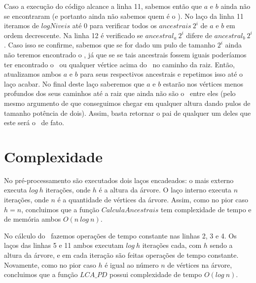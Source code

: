 Caso a execução do código alcance a linha 11, sabemos então que $a$ e $b$ ainda não se encontraram (e portanto ainda não sabemos quem é o \LCA). No laço da linha 11 iteramos de $logNiveis$ até 0 para verificar todos os $ancestrais\ 2^i$ de $a$ e $b$ em ordem decrescente. Na linha 12 é verificado se $ancestral_a\ 2^i$ difere de $ancestral_b\ 2^i$. Caso isso se confirme, sabemos que se for dado um pulo de tamanho $2^i$ ainda não teremos encontrado o \LCA, já que se se tais ancestrais fossem iguais poderíamos ter encontrado o \LCA\ ou qualquer vértice acima do \LCA\ no caminho da raiz. Então, atualizamos ambos $a$ e $b$ para seus respectivos ancestrais e repetimos isso até o laço acabar. No final deste laço saberemos que $a$ e $b$ estarão nos vértices menos profundos dos seus caminhos até a raiz que ainda não são o \LCA\ entre eles (pelo mesmo argumento de que conseguimos chegar em qualquer altura dando pulos de tamanho potência de dois). Assim, basta retornar o pai de qualquer um deles que este será o \LCA\ de fato.

\vspace{10cm}

\section{Complexidade}

No pré-processamento são executados dois laços encadeados: o mais externo executa $log\ h$ iterações, onde $h$ é a altura da árvore. O laço interno executa $n$ iterações, onde $n$ é a quantidade de vértices da árvore. Assim, como no pior caso $h = n$, concluimos que a função $CalculaAncestrais$ tem complexidade de tempo e de memória ambos $O(n\ log\ n)$.

No cálculo do \LCA\ fazemos operações de tempo constante nas linhas 2, 3 e 4. Os laços das linhas 5 e 11 ambos executam $log\ h$ iterações cada, com $h$ sendo a altura da árvore, e em cada iteração são feitas operações de tempo constante. Novamente, como no pior caso $h$ é igual ao número $n$ de vértices na árvore, concluimos que a função $LCA\_PD$ possui complexidade de tempo $O(log\ n)$.